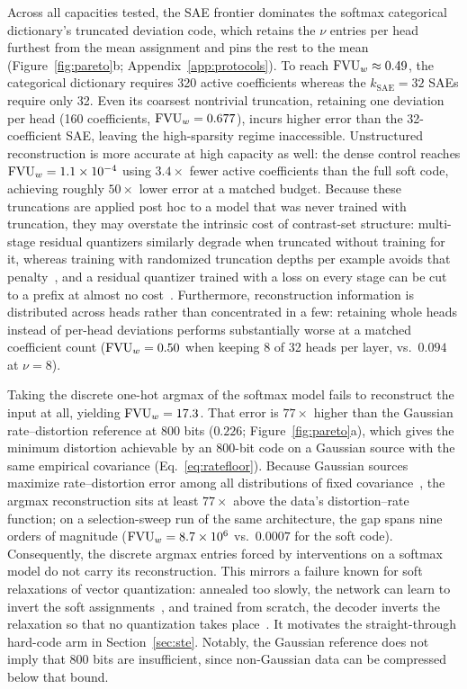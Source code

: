 Across all capacities tested, the SAE frontier dominates the softmax
categorical dictionary's truncated deviation code, which retains the $\nu$
entries per head furthest from the mean assignment and pins the rest to
the mean (Figure~\ref{fig:pareto}b; Appendix~\ref{app:protocols}). To
reach $\mathrm{FVU}_w \approx 0.49$, the categorical dictionary requires 320 active
coefficients whereas the $k_{\mathrm{SAE}}{=}32$ SAEs require only 32.
Even its coarsest nontrivial truncation, retaining one deviation per head
(160 coefficients, $\mathrm{FVU}_w = 0.677$), incurs higher error than the
32-coefficient SAE, leaving the high-sparsity regime inaccessible.
Unstructured reconstruction is more
accurate at high capacity as well: the dense control reaches
$\mathrm{FVU}_w = 1.1\times10^{-4}$ using $3.4\times$ fewer active coefficients than
the full soft code, achieving roughly $50\times$ lower error at a matched
budget. Because these truncations are applied post hoc to a model that was
never trained with truncation, they may overstate the intrinsic cost of
contrast-set structure: multi-stage residual quantizers similarly degrade
when truncated without training for it, whereas training with randomized
truncation depths per example avoids that penalty~\cite{zeghidour2021}, and
a residual quantizer trained with a loss on every stage can be cut to a
prefix at almost no cost~\cite{huijben2024}.
Furthermore, reconstruction information is distributed across heads rather
than concentrated in a few: retaining whole heads instead of per-head
deviations performs substantially worse at a matched coefficient count
($\mathrm{FVU}_w = 0.50$ when keeping 8 of 32 heads per layer, vs.\ $0.094$ at
$\nu{=}8$).

Taking the discrete one-hot argmax of the softmax model fails to reconstruct
the input at all, yielding $\mathrm{FVU}_w = 17.3$. That error is $77\times$ higher
than the Gaussian rate--distortion reference at 800 bits ($0.226$;
Figure~\ref{fig:pareto}a), which gives the minimum distortion achievable by
an 800-bit code on a Gaussian source with the same empirical covariance
(Eq.~\eqref{eq:ratefloor}). Because Gaussian sources maximize rate--distortion
error among all distributions of fixed covariance~\cite[Problem~10.8]{cover2006},
the argmax reconstruction sits at least $77\times$ above the data's
distortion--rate function; on a selection-sweep run of the same
architecture, the gap spans nine orders of magnitude ($\mathrm{FVU}_w = 8.7\times10^6$
vs.\ $0.0007$ for the soft code). Consequently, the discrete argmax entries
forced by interventions on a softmax model do not carry its reconstruction.
This mirrors a failure known for soft relaxations of vector quantization:
annealed too slowly, the network can learn to invert the soft
assignments~\cite{agustsson2017}, and trained from scratch, the decoder
inverts the relaxation so that no quantization takes
place~\cite{vandenoord2017}. It motivates the
straight-through hard-code arm in Section~\ref{sec:ste}. Notably, the
Gaussian reference does not imply that 800 bits are insufficient, since
non-Gaussian data can be compressed below that bound.

